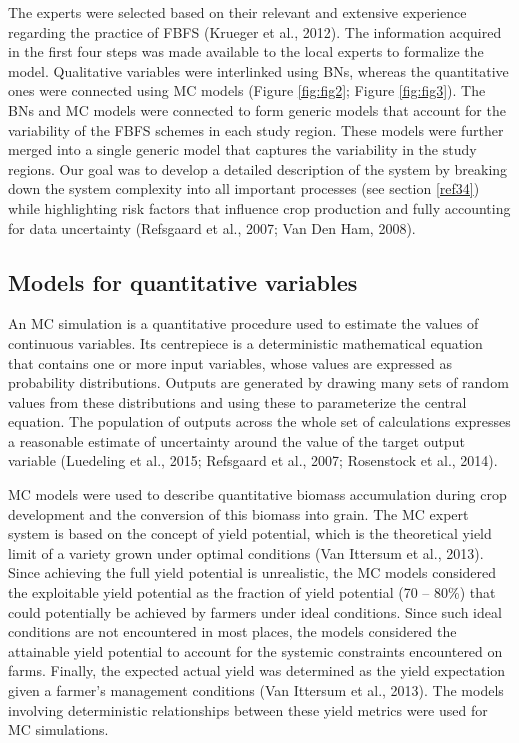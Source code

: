\documentclass[]{elsarticle} %
\begin{document}
The experts were selected based on their relevant and extensive experience regarding the practice of FBFS (Krueger et al., 2012). The information acquired in the first four steps was made available to the local experts to formalize the model. Qualitative variables were interlinked using BNs, whereas the quantitative ones were connected using MC models (Figure \ref{fig:fig2}; Figure \ref{fig:fig3}). The BNs and MC models were connected to form generic models that account for the variability of the FBFS schemes in each study region. These models were further merged into a single generic model that captures the variability in the study regions. Our goal was to develop a detailed description of the system by breaking down the system complexity into all important processes (see section \ref{ref34}) while highlighting risk factors that influence crop production and fully accounting for data uncertainty (Refsgaard et al., 2007; Van Den Ham, 2008).

\hypertarget{ref32}{%
\subsection{Models for quantitative variables}\label{ref32}}

An MC simulation is a quantitative procedure used to estimate the values of continuous variables. Its centrepiece is a deterministic mathematical equation that contains one or more input variables, whose values are expressed as probability distributions. Outputs are generated by drawing many sets of random values from these distributions and using these to parameterize the central equation. The population of outputs across the whole set of calculations expresses a reasonable estimate of uncertainty around the value of the target output variable (Luedeling et al., 2015; Refsgaard et al., 2007; Rosenstock et al., 2014).

MC models were used to describe quantitative biomass accumulation during crop development and the conversion of this biomass into grain. The MC expert system is based on the concept of yield potential, which is the theoretical yield limit of a variety grown under optimal conditions (Van Ittersum et al., 2013). Since achieving the full yield potential is unrealistic, the MC models considered the exploitable yield potential as the fraction of yield potential (70 -- 80\%) that could potentially be achieved by farmers under ideal conditions. Since such ideal conditions are not encountered in most places, the models considered the attainable yield potential to account for the systemic constraints encountered on farms. Finally, the expected actual yield was determined as the yield expectation given a farmer's management conditions (Van Ittersum et al., 2013). The models involving deterministic relationships between these yield metrics were used for MC simulations.
\end{document}
